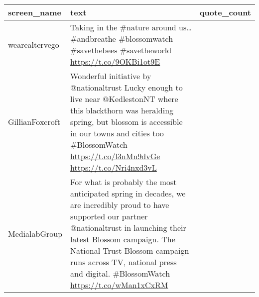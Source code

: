 \documentclass[
]{article}
\begin{document}
\begin{longtable}[]{@{}llr@{}}
\toprule
\begin{minipage}[b]{0.23\columnwidth}\raggedright
screen\_name\strut
\end{minipage} & \begin{minipage}[b]{0.42\columnwidth}\raggedright
text\strut
\end{minipage} & \begin{minipage}[b]{0.18\columnwidth}\raggedleft
quote\_count\strut
\end{minipage}\tabularnewline
\midrule
\endhead
\begin{minipage}[t]{0.23\columnwidth}\raggedright
wearealtervego\strut
\end{minipage} & \begin{minipage}[t]{0.42\columnwidth}\raggedright
Taking in the \#nature around us\ldots\#andbreathe \#blossomwatch
\#savethebees \#savetheworld \url{https://t.co/9OKBi1ot9E}\strut
\end{minipage} & \begin{minipage}[t]{0.18\columnwidth}\raggedleft
3\strut
\end{minipage}\tabularnewline
\begin{minipage}[t]{0.23\columnwidth}\raggedright
GillianFoxcroft\strut
\end{minipage} & \begin{minipage}[t]{0.42\columnwidth}\raggedright
Wonderful initiative by @nationaltrust Lucky enough to live near
@KedlestonNT where this blackthorn was heralding spring, but blossom is
accessible in our towns and cities too \#BlossomWatch
\url{https://t.co/l3nMn9dvGe} \url{https://t.co/Nri4nxd3vL}\strut
\end{minipage} & \begin{minipage}[t]{0.18\columnwidth}\raggedleft
3\strut
\end{minipage}\tabularnewline
\begin{minipage}[t]{0.23\columnwidth}\raggedright
MedialabGroup\strut
\end{minipage} & \begin{minipage}[t]{0.42\columnwidth}\raggedright
For what is probably the most anticipated spring in decades, we are
incredibly proud to have supported our partner @nationaltrust in
launching their latest Blossom campaign. The National Trust Blossom
campaign runs across TV, national press and digital. \#BlossomWatch
\url{https://t.co/wMan1xCxRM}\strut
\end{minipage} & \begin{minipage}[t]{0.18\columnwidth}\raggedleft

\end{minipage}
\end{longtable}
\end{document}

